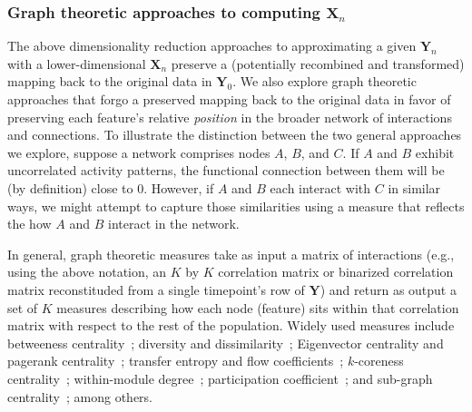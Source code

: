 \documentclass[english]{article}
\begin{document}
\subsubsection*{Graph theoretic approaches to computing
  $\mathbf{X}_n$}
The above dimensionality reduction approaches to approximating a given
$\mathbf{Y}_n$ with a lower-dimensional $\mathbf{X}_n$ preserve a
(potentially recombined and transformed) mapping back to the original
data in $\mathbf{Y}_0$.  We also explore graph theoretic approaches
that forgo a preserved mapping back to the original data in favor of
preserving each feature's relative \textit{position} in the broader
network of interactions and connections.  To illustrate the
distinction between the two general approaches we explore, suppose a
network comprises nodes $A$, $B$, and $C$.  If $A$ and $B$ exhibit
uncorrelated activity patterns, the functional connection between
them will be (by definition) close to 0.  However, if $A$ and $B$ each
interact with $C$ in similar ways, we might attempt to capture those
similarities using a measure that reflects the how $A$ and $B$
interact in the network.

In general, graph theoretic measures take as input a matrix of
interactions (e.g., using the above notation, an $K$ by $K$
correlation matrix or binarized correlation matrix reconstituded from
a single timepoint's row of $\mathbf{Y}$) and return as output a set
of $K$ measures describing how each node (feature) sits within that
correlation matrix with respect to the rest of the population.  Widely
used measures include betweeness centrality~\citep[the proportion of
shortest paths between each pair of nodes in the population that
involves the given node in question; e.g., ][]{Newm05, OpsaEtal10,
  Bart04, GeisEtal08, Free77}; diversity and
dissimilarity~\citep[characterizations of how differently connected a
given node is from others in the population; e.g., ][]{Rao82, Lin09,
  RicoSzei06}; Eigenvector centrality and pagerank
centrality~\citep[measures of how influential a given node is within
the broader network; e.g., ][]{Newm08, Bona07, LohmEtal10,
  HaluEtal13}; transfer entropy and flow coefficients~\citep[a measure
of how much information is flowing from a given node to other nodes in
the network; e.g., ][]{HoneEtal07, Schr00}; $k$-coreness
centrality~\citep[a measure of the connectivity of a node within its
local sub-graph; e.g., ][]{AlvaEtal05, ChriFowl10}; within-module
degree~\citep[a measure of how many connections a node has to its
close neighbors in the network; e.g., ][]{RubiSpor10}; participation
coefficient~\citep[a measure of the diversity of a node's connections
to different sub-graphs in the network; e.g., ][]{RubiSpor10}; and
sub-graph centrality~\citep[a measure of a node's participation in all
of the network's sub-graphs; e.g., ][]{EstrRodr05}; among others.
\end{document}
